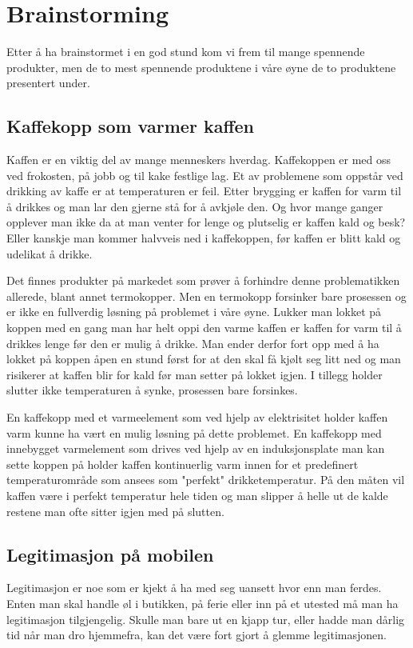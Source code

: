 \chapter{Brainstorming}

Etter å ha brainstormet i en god stund kom vi frem til mange spennende produkter, men de to mest spennende produktene i våre øyne de to produktene presentert under.
\section{Kaffekopp som varmer kaffen}
Kaffen er en viktig del av mange menneskers hverdag. Kaffekoppen er med oss ved frokosten, på jobb og til kake festlige lag. Et av problemene som oppstår ved drikking av kaffe er at temperaturen er feil. Etter brygging er kaffen for varm til å drikkes og man lar den gjerne stå for å avkjøle den. Og hvor mange ganger opplever man ikke da at man venter for lenge og plutselig er kaffen kald og besk? Eller kanskje man kommer halvveis ned i kaffekoppen, før kaffen er blitt kald og udelikat å drikke.

Det finnes produkter på markedet som prøver å forhindre denne problematikken allerede, blant annet termokopper. Men en termokopp forsinker bare prosessen og er ikke en fullverdig løsning på problemet i våre øyne. Lukker man lokket på koppen med en gang man har helt oppi den varme kaffen er kaffen for varm til å drikkes lenge før den er mulig å drikke. Man ender derfor fort opp med å ha lokket på koppen åpen en stund først for at den skal få kjølt seg litt ned og man risikerer at kaffen blir for kald før man setter på lokket igjen. I tillegg holder slutter ikke temperaturen å synke, prosessen bare forsinkes.

En kaffekopp med et varmeelement som ved hjelp av elektrisitet holder kaffen varm kunne ha vært en mulig løsning på dette problemet. En kaffekopp med innebygget varmelement som drives ved hjelp av en induksjonsplate man kan sette koppen på holder kaffen kontinuerlig varm innen for et predefinert temperaturområde som ansees som "perfekt" drikketemperatur. På den måten vil kaffen være i perfekt temperatur hele tiden og man slipper å helle ut de kalde restene man ofte sitter igjen med på slutten.


\section{Legitimasjon på mobilen}
Legitimasjon er noe som er kjekt å ha med seg uansett hvor enn man ferdes. Enten man skal handle øl i butikken, på ferie eller inn på et utested må man ha legitimasjon tilgjengelig. Skulle man bare ut en kjapp tur, eller hadde man dårlig tid når man dro hjemmefra, kan det være fort gjort å glemme legitimasjonen.

